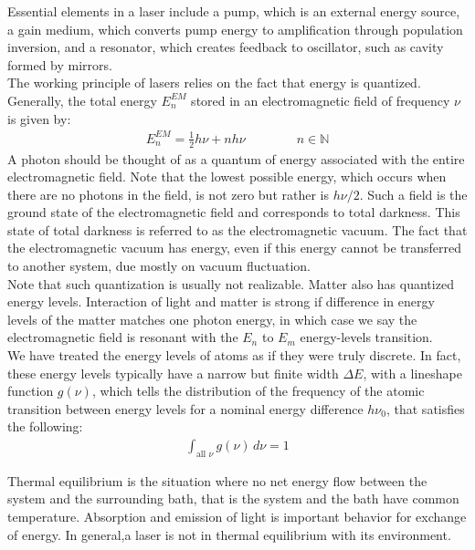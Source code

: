 \documentclass[11pt]{book}
\theoremstyle{break}
\theoremstyle{break}
\newcommand{\N}{\mathbb{N}}
\begin{document}
Essential elements in a laser include a pump, which is an external energy source, a gain medium, which converts pump energy to amplification through population inversion, and a resonator, which creates feedback to oscillator, such as cavity formed by mirrors.\\

The working principle of lasers relies on the fact that energy is quantized. Generally, the total energy $E_n^{EM}$ stored in an electromagnetic field of frequency $\nu$ is given by:
\begin{align*}
E_n^{EM} = \frac{1}{2}h\nu + n h\nu \qquad \qquad n\in \N
\end{align*}
A photon should be thought of
as a quantum of energy associated with the entire electromagnetic field. Note
that the lowest possible energy, which occurs when there are no photons in
the field, is not zero but rather is $h\nu/2$. Such a field is the
ground state of the electromagnetic field and corresponds to total darkness. This state of total darkness is referred to as the electromagnetic vacuum. The fact that the electromagnetic vacuum has energy, even if this energy cannot
be transferred to another system, due mostly on vacuum fluctuation.\\


Note that such quantization is usually not realizable. Matter also has quantized energy levels. Interaction of light and matter is strong if difference in energy levels of the matter matches one photon energy, in which case we say the electromagnetic field is resonant with the $E_n$ to $E_m$ energy-levels transition. \\

We have treated the energy levels of atoms as if they were truly discrete. In fact, these energy levels typically have a narrow but finite width $\Delta E$, with a lineshape function $g(\nu)$, which tells the distribution of the frequency of the atomic transition between energy levels for a nominal energy difference $h\nu_0$, that satisfies the following:
\begin{align*}
\int_{\text{all }\nu} g(\nu)\, d\nu = 1
\end{align*}


Thermal equilibrium is the situation where no net energy flow between the system and the surrounding bath, that is the system and the bath have common temperature. Absorption and emission of light is important behavior for exchange of energy. In general,a laser is not in thermal equilibrium with its environment. \\
\end{document}
